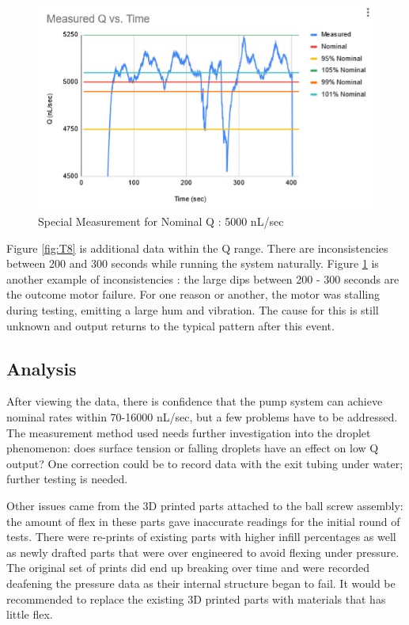 \documentclass[journal]{IEEEtran}
\begin{document}
            \begin{figure}[H]
                \centering
                \includegraphics[scale = 0.65]{T9}
                \caption{Special Measurement for Nominal Q : 5000 nL/sec}
                \label{fig:T9}
            \end{figure}
            
            Figure \ref{fig:T8} is additional data within the Q range. There are inconsistencies between 200 and 300 seconds while running the system naturally. Figure \ref{fig:T9} is another example of inconsistencies : the large dips between 200 - 300 seconds are the outcome motor failure. For one reason or another, the motor was stalling during testing, emitting a large hum and vibration. The cause for this is still unknown and output returns to the typical pattern after this event.
        
    \subsection{Analysis}
        After viewing the data, there is confidence that the pump system can achieve nominal rates within 70-16000 nL/sec, but a few problems have to be addressed. The measurement method used needs further investigation into the droplet phenomenon: does surface tension or falling droplets have an effect on low Q output? One correction could be to record data with the exit tubing under water; further testing is needed. 
        
        Other issues came from the 3D printed parts attached to the ball screw assembly: the amount of flex in these parts gave inaccurate readings for the initial round of tests. There were re-prints of existing parts with higher infill percentages as well as newly drafted parts that were over engineered to avoid flexing under pressure. The original set of prints did end up breaking over time and were recorded deafening the pressure data as their internal structure began to fail. It would be recommended to replace the existing 3D printed parts with materials that has little flex. 
        
\end{document}
